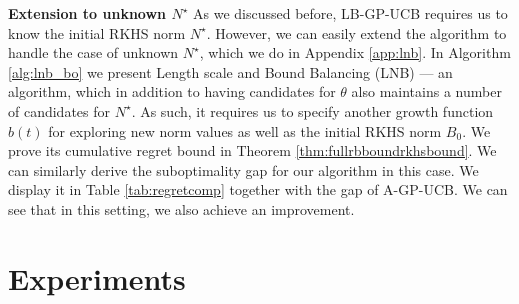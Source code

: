 \documentclass{article}
\theoremstyle{plain}
\theoremstyle{definition}
\theoremstyle{remark}
\theoremstyle{plain}
\begin{document}


\textbf{Extension to unknown $N^\star$} As we discussed before, LB-GP-UCB requires us to know the initial RKHS norm $N^\star$. However, we can easily extend the algorithm to handle the case of unknown $N^\star$, which we do in Appendix \ref{app:lnb}. In Algorithm \ref{alg:lnb_bo} we present Length scale and Bound Balancing (LNB) --- an algorithm, which in addition to having candidates for $\theta$ also maintains a number of candidates for $N^\star$. As such, it requires us to specify another growth function $b(t)$ for exploring new norm values as well as the initial RKHS norm $B_0$. We prove its cumulative regret bound in Theorem \ref{thm:fullrbboundrkhsbound}. We can similarly derive the suboptimality gap for our algorithm in this case. We display it in Table \ref{tab:regretcomp} together with the gap of A-GP-UCB. We can see that in this setting, we also achieve an improvement.




\section{Experiments}\label{sec:experiment}
\end{document}
